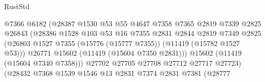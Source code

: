 \begin{lexlean}{RustStd}
\begin{coremodule}
                                          @7366
                                          @6182
                                          (@28387
                                            @1530
                                            @53
                                            @55
                                            @4647
                                            @7358
                                            @7365
                                            @2819
                                            @7339
                                            @2825
                                            @26843
                                            (@28386
                                              @1528
                                              @103
                                              @53
                                              @16
                                              @7355
                                              @2831
                                              @2844
                                              @2819
                                              @7349
                                              @2825
                                              (@26803
                                                @1527
                                                @7355
                                                (@15776 (@15777 @7355))
                                                (@11419 (@15782 @1527 @53)))
                                              @26771
                                              @15602
                                              (@11419 (@15604 @7350 @2831)))
                                            @15602
                                            (@11419 (@15604 @7340 @7358)))
                                          @27702
                                          @27705
                                          @27708
                                          @27712
                                          @27717
                                          @27723)
                                        (@28432
                                          @7368
                                          @1539
                                          @1546
                                          @13
                                          @2831
                                          @7374
                                          @2831
                                          @7381
                                          (@28777

\end{coremodule}
\end{lexlean}

